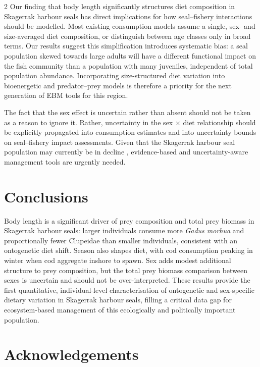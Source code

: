 \begin{spacing}{2}
Our finding that body length significantly structures diet composition in
Skagerrak harbour seals has direct implications for how seal--fishery
interactions should be modelled. Most existing consumption models assume a
single, sex- and size-averaged diet composition, or distinguish between age
classes only in broad terms. Our results suggest this simplification
introduces systematic bias: a seal population skewed towards large adults
will have a different functional impact on the fish community than a
population with many juveniles, independent of total population abundance.
Incorporating size-structured diet variation into bioenergetic and
predator--prey models is therefore a priority for the next generation of EBM
tools for this region.

The fact that the sex effect is uncertain rather than absent should not be
taken as a reason to ignore it. Rather, uncertainty in the sex $\times$ diet
relationship should be explicitly propagated into consumption estimates and
into uncertainty bounds on seal--fishery impact assessments. Given that the
Skagerrak harbour seal population may currently be in decline
\citep{Carroll2025, Larsson2024}, evidence-based and uncertainty-aware
management tools are urgently needed.

\section{Conclusions}

Body length is a significant driver of prey composition and total prey
biomass in Skagerrak harbour seals: larger individuals consume more
\textit{Gadus morhua} and proportionally fewer Clupeidae than smaller
individuals, consistent with an ontogenetic diet shift. Season also shapes
diet, with cod consumption peaking in winter when cod aggregate inshore to
spawn. Sex adds modest additional structure to prey composition, but the
total prey biomass comparison between sexes is uncertain and should not be
over-interpreted. These results provide the first quantitative,
individual-level characterisation of ontogenetic and sex-specific dietary
variation in Skagerrak harbour seals, filling a critical data gap for
ecosystem-based management of this ecologically and politically important
population.

\section{Acknowledgements}


\end{spacing}
